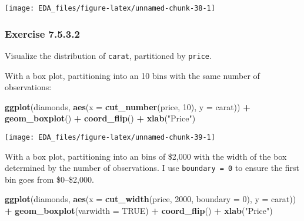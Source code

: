 \documentclass[]{book}
\newenvironment{Shaded}{\begin{snugshade}}{\end{snugshade}}
\newcommand{\DataTypeTok}[1]{\textcolor[rgb]{0.13,0.29,0.53}{#1}}
\newcommand{\DecValTok}[1]{\textcolor[rgb]{0.00,0.00,0.81}{#1}}
\newcommand{\KeywordTok}[1]{\textcolor[rgb]{0.13,0.29,0.53}{\textbf{#1}}}
\newcommand{\NormalTok}[1]{#1}
\newcommand{\OperatorTok}[1]{\textcolor[rgb]{0.81,0.36,0.00}{\textbf{#1}}}
\newcommand{\OtherTok}[1]{\textcolor[rgb]{0.56,0.35,0.01}{#1}}
\newcommand{\StringTok}[1]{\textcolor[rgb]{0.31,0.60,0.02}{#1}}
\theoremstyle{plain}
\theoremstyle{remark}
\theoremstyle{definition}
\theoremstyle{definition}
\theoremstyle{definition}
\theoremstyle{remark}
\begin{document}
\begin{center}\texttt{[image: EDA\_files/figure-latex/unnamed-chunk-38-1]} \end{center}

\hypertarget{exercise-7.5.3.2}{%
\subsubsection*{\texorpdfstring{Exercise
{7.5.3.2}}{Exercise 7.5.3.2}}\label{exercise-7.5.3.2}}

Visualize the distribution of \texttt{carat}, partitioned by
\texttt{price}.

With a box plot, partitioning into an 10 bins with the same number of
observations:

\begin{Shaded}
\begin{Highlighting}[]
\KeywordTok{ggplot}\NormalTok{(diamonds, }\KeywordTok{aes}\NormalTok{(}\DataTypeTok{x =} \KeywordTok{cut_number}\NormalTok{(price, }\DecValTok{10}\NormalTok{), }\DataTypeTok{y =}\NormalTok{ carat)) }\OperatorTok{+}
\StringTok{  }\KeywordTok{geom_boxplot}\NormalTok{() }\OperatorTok{+}
\StringTok{  }\KeywordTok{coord_flip}\NormalTok{() }\OperatorTok{+}
\StringTok{  }\KeywordTok{xlab}\NormalTok{(}\StringTok{"Price"}\NormalTok{)}
\end{Highlighting}
\end{Shaded}

\begin{center}\texttt{[image: EDA\_files/figure-latex/unnamed-chunk-39-1]} \end{center}

With a box plot, partitioning into an bins of \$2,000 with the width of
the box determined by the number of observations. I use
\texttt{boundary\ =\ 0} to ensure the first bin goes from \$0--\$2,000.

\begin{Shaded}
\begin{Highlighting}[]
\KeywordTok{ggplot}\NormalTok{(diamonds, }\KeywordTok{aes}\NormalTok{(}\DataTypeTok{x =} \KeywordTok{cut_width}\NormalTok{(price, }\DecValTok{2000}\NormalTok{, }\DataTypeTok{boundary =} \DecValTok{0}\NormalTok{), }\DataTypeTok{y =}\NormalTok{ carat)) }\OperatorTok{+}
\StringTok{  }\KeywordTok{geom_boxplot}\NormalTok{(}\DataTypeTok{varwidth =} \OtherTok{TRUE}\NormalTok{) }\OperatorTok{+}
\StringTok{  }\KeywordTok{coord_flip}\NormalTok{() }\OperatorTok{+}
\StringTok{  }\KeywordTok{xlab}\NormalTok{(}\StringTok{"Price"}\NormalTok{)}
\end{Highlighting}
\end{Shaded}
\end{document}
